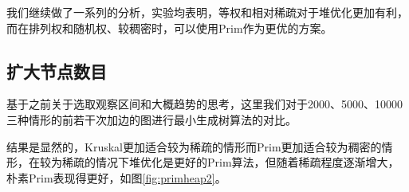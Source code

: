 \documentclass[UTF8]{ctexart}
\begin{document}
我们继续做了一系列的分析，实验均表明，等权和相对稀疏对于堆优化更加有利，而在排列权和随机权、较稠密时，可以使用Prim作为更优的方案。


\subsection{扩大节点数目}
基于之前关于选取观察区间和大概趋势的思考，这里我们对于2000、5000、10000三种情形的前若干次加边的图进行最小生成树算法的对比。

结果是显然的，Kruskal更加适合较为稀疏的情形而Prim更加适合较为稠密的情形，在较为稀疏的情况下堆优化是更好的Prim算法，但随着稀疏程度逐渐增大，朴素Prim表现得更好，如图\ref{fig:primheap2}。
\begin{figure}[htbp]
    \centering
    

\end{figure}
\end{document}
